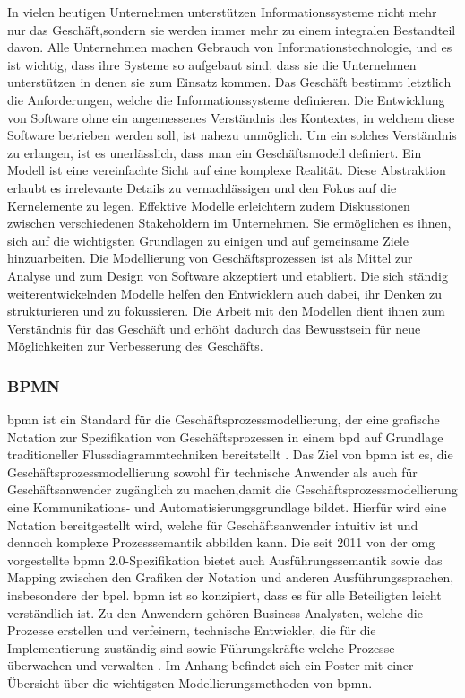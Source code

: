 \documentclass[a4paper, 12pt, twoside, headsepline=true]{scrartcl} %
\begin{document}
In vielen heutigen Unternehmen unterstützen Informationssysteme nicht mehr nur das Geschäft,sondern sie werden immer mehr zu einem integralen Bestandteil davon. Alle Unternehmen machen Gebrauch von Informationstechnologie, und es ist wichtig, dass ihre Systeme so aufgebaut sind, dass sie die Unternehmen unterstützen in denen sie zum Einsatz kommen. Das Geschäft bestimmt letztlich die Anforderungen, welche die Informationssysteme definieren. Die Entwicklung von Software ohne ein angemessenes Verständnis des Kontextes, in welchem diese Software betrieben werden soll, ist nahezu unmöglich. Um ein solches Verständnis zu erlangen, ist es unerlässlich, dass man ein Geschäftsmodell definiert. Ein Modell ist eine vereinfachte Sicht auf eine
komplexe Realität. Diese Abstraktion erlaubt es irrelevante Details zu vernachlässigen und den Fokus auf die Kernelemente zu legen. Effektive Modelle erleichtern zudem
Diskussionen zwischen verschiedenen Stakeholdern im Unternehmen.
Sie ermöglichen es ihnen, sich auf die wichtigsten Grundlagen zu einigen und auf gemeinsame Ziele hinzuarbeiten. Die Modellierung von Geschäftsprozessen ist als Mittel zur Analyse und zum Design von Software akzeptiert und etabliert. Die sich ständig weiterentwickelnden Modelle helfen den Entwicklern auch dabei, ihr Denken zu strukturieren und zu fokussieren. Die Arbeit mit den Modellen dient ihnen zum Verständnis für das Geschäft und erhöht dadurch das Bewusstsein für neue Möglichkeiten zur Verbesserung des Geschäfts.

\subsubsection{BPMN}

\ac{bpmn} ist ein Standard für die Geschäftsprozessmodellierung, der eine grafische Notation zur Spezifikation von Geschäftsprozessen in einem \ac{bpd} auf Grundlage traditioneller Flussdiagrammtechniken bereitstellt \cite[S.222]{Aagesen2015}. Das Ziel von \ac{bpmn} ist es, die Geschäftsprozessmodellierung sowohl für technische Anwender als auch für Geschäftsanwender zugänglich zu machen,damit die Geschäftsprozessmodellierung eine Kommunikations- und Automatisierungsgrundlage bildet. Hierfür wird eine Notation bereitgestellt wird, welche für Geschäftsanwender intuitiv ist und dennoch komplexe Prozesssemantik abbilden kann. Die seit 2011 von der \ac{omg} vorgestellte \ac{bpmn} 2.0-Spezifikation bietet auch Ausführungssemantik sowie das Mapping zwischen den Grafiken der Notation und anderen Ausführungssprachen, insbesondere der \ac{bpel}. \ac{bpmn} ist so konzipiert, dass es für alle Beteiligten leicht verständlich ist.
Zu den Anwendern gehören Business-Analysten, welche die Prozesse erstellen und verfeinern, technische Entwickler, die für die Implementierung zuständig sind sowie Führungskräfte welche Prozesse überwachen und verwalten \cite{vonRosing2015433}. Im Anhang befindet sich ein Poster mit einer Übersicht über die wichtigsten Modellierungsmethoden von \ac{bpmn}. 
\end{document}
